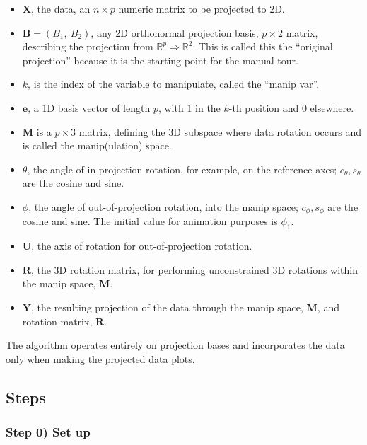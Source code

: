 \begin{itemize}
\tightlist
\item
  \(\textbf{X}\), the data, an \(n \times p\) numeric matrix to be
  projected to 2D.
\item
  \(\textbf{B} = (B_1,~ B_2)\), any 2D orthonormal projection basis,
  \(p \times 2\) matrix, describing the projection from
  \(\mathbb{R}^p \Rightarrow \mathbb{R}^2\). This is called this the
  ``original projection'' because it is the starting point for the
  manual tour.
\item
  \(k\), is the index of the variable to manipulate, called the ``manip
  var''. 
\item
  \(\textbf{e}\), a 1D basis vector of length \(p\), with 1 in the
  \(k\)-th position and 0 elsewhere.
\item
  \(\textbf{M}\) is a \(p \times 3\) matrix, defining the 3D subspace
  where data rotation occurs and is called the manip(ulation) space.
\item
  \(\theta\), the angle of in-projection rotation, for example, on the
  reference axes; \(c_\theta, s_\theta\) are the cosine and sine.
\item
  \(\phi\), the angle of out-of-projection rotation, into the manip
  space; \(c_\phi, s_\phi\) are the cosine and sine. The initial value
  for animation purposes is \(\phi_1\).
\item
  \(\textbf{U}\), the axis of rotation for out-of-projection rotation.
\item
  \(\textbf{R}\), the 3D rotation matrix, for performing unconstrained
  3D rotations within the manip space, \(\textbf{M}\).
\item
  \(\textbf{Y}\), the resulting projection of the data through the manip
  space, \(\textbf{M}\), and rotation matrix, \(\textbf{R}\). 
\end{itemize}

The algorithm operates entirely on projection bases and incorporates the
data only when making the projected data plots.

\hypertarget{steps}{%
\subsection{Steps}\label{steps}}

\hypertarget{step-0-set-up}{%
\subsubsection{Step 0) Set up}\label{step-0-set-up}}

